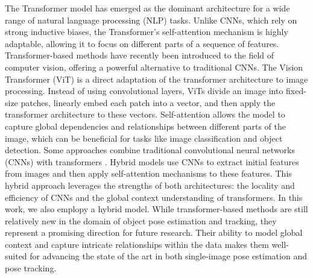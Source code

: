 The Transformer model \cite{vaswani2017attention} has emerged as the dominant architecture for a wide range of natural language processing (NLP) tasks. Unlike CNNs, which rely on strong inductive biases, the Transformer's self-attention mechanism is highly adaptable, allowing it to focus on different parts of a sequence of features. Transformer-based methods have recently been introduced to the field of computer vision, offering a powerful alternative to traditional CNNs. The Vision Transformer (ViT) \cite{dosovitskiy2020image} is a direct adaptation of the transformer architecture to image processing. Instead of using convolutional layers, ViTs divide an image into fixed-size patches, linearly embed each patch into a vector, and then apply the transformer architecture to these vectors. Self-attention allows the model to capture global dependencies and relationships between different parts of the image, which can be beneficial for tasks like image classification and object detection. Some approaches combine traditional convolutional neural networks (CNNs) with transformers \cite{liu2021swin, guo2022cmt}. Hybrid models use CNNs to extract initial features from images and then apply self-attention mechanisms to these features. This hybrid approach leverages the strengths of both architectures: the locality and efficiency of CNNs and the global context understanding of transformers. In this work, we also emplopy a hybrid model. While transformer-based methods are still relatively new in the domain of object pose estimation and tracking, they represent a promising direction for future research. Their ability to model global context and capture intricate relationships within the data makes them well-suited for advancing the state of the art in both single-image pose estimation and pose tracking.
